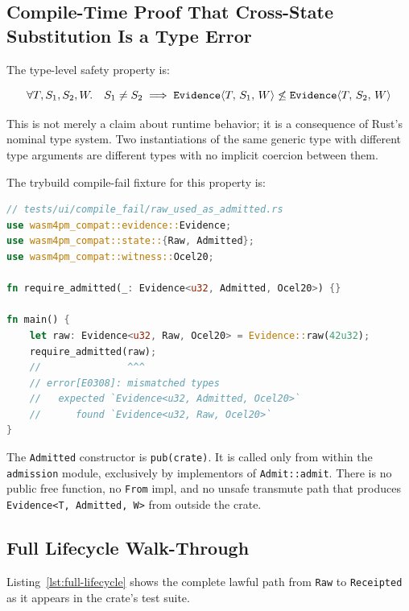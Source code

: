 \subsection{Compile-Time Proof That Cross-State Substitution Is a Type Error}

The type-level safety property is:

\begin{equation}
  \label{eq:no-subtype}
  \forall T, S_1, S_2, W.\quad S_1 \neq S_2
  \implies
  \texttt{Evidence}\langle T,\, S_1,\, W \rangle \not\leq \texttt{Evidence}\langle T,\, S_2,\, W \rangle
\end{equation}

This is not merely a claim about runtime behavior; it is a consequence of
Rust's nominal type system. Two instantiations of the same generic type with
different type arguments are different types with no implicit coercion between
them.

The trybuild compile-fail fixture for this property is:

\begin{lstlisting}[language=Rust, caption={Compile-fail fixture: assigning
  \texttt{Raw} evidence to an \texttt{Admitted} binding is a type error.
  The error fires for the named lifecycle law, not accidentally.},
  label={lst:cf-raw-as-admitted}]
// tests/ui/compile_fail/raw_used_as_admitted.rs
use wasm4pm_compat::evidence::Evidence;
use wasm4pm_compat::state::{Raw, Admitted};
use wasm4pm_compat::witness::Ocel20;

fn require_admitted(_: Evidence<u32, Admitted, Ocel20>) {}

fn main() {
    let raw: Evidence<u32, Raw, Ocel20> = Evidence::raw(42u32);
    require_admitted(raw);
    //               ^^^
    // error[E0308]: mismatched types
    //   expected `Evidence<u32, Admitted, Ocel20>`
    //      found `Evidence<u32, Raw, Ocel20>`
}
\end{lstlisting}

The \texttt{Admitted} constructor is \texttt{pub(crate)}. It is called only
from within the \texttt{admission} module, exclusively by implementors of
\texttt{Admit::admit}. There is no public free function, no \texttt{From}
impl, and no unsafe transmute path that produces \texttt{Evidence<T, Admitted,
W>} from outside the crate.

\subsection{Full Lifecycle Walk-Through}

Listing~\ref{lst:full-lifecycle} shows the complete lawful path from \texttt{Raw}
to \texttt{Receipted} as it appears in the crate's test suite.

